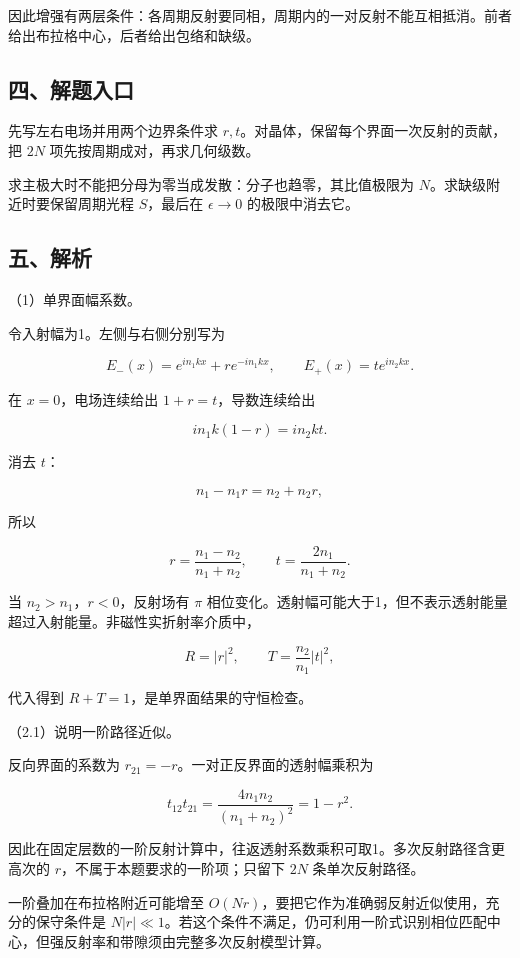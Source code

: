 \documentclass[12pt,a4paper,fontset=fandol]{ctexart}
\begin{document}
因此增强有两层条件：各周期反射要同相，周期内的一对反射不能互相抵消。前者给出布拉格中心，后者给出包络和缺级。

\subsection{四、解题入口}\label{ux56dbux89e3ux9898ux5165ux53e3-6}

先写左右电场并用两个边界条件求
\(r,t\)。对晶体，保留每个界面一次反射的贡献，把 \(2N\)
项先按周期成对，再求几何级数。

求主极大时不能把分母为零当成发散：分子也趋零，其比值极限为
\(N\)。求缺级附近时要保留周期光程 \(S\)，最后在 \(\epsilon\to0\)
的极限中消去它。

\subsection{五、解析}\label{ux4e94ux89e3ux6790-6}

（1）单界面幅系数。

令入射幅为1。左侧与右侧分别写为

\[
E_-(x)=e^{in_1kx}+r e^{-in_1kx},\qquad
E_+(x)=t e^{in_2kx}.
\]

在 \(x=0\)，电场连续给出 \(1+r=t\)，导数连续给出

\[
in_1k(1-r)=in_2kt.
\]

消去 \(t\)：

\[
n_1-n_1r=n_2+n_2r,
\]

所以

\[
\boxed{r=\frac{n_1-n_2}{n_1+n_2},\qquad
t=\frac{2n_1}{n_1+n_2}.}
\tag{7.1}
\]

当 \(n_2>n_1\)，\(r<0\)，反射场有 \(\pi\)
相位变化。透射幅可能大于1，但不表示透射能量超过入射能量。非磁性实折射率介质中，

\[
R=|r|^2,\qquad T=\frac{n_2}{n_1}|t|^2,
\]

代入得到 \(R+T=1\)，是单界面结果的守恒检查。

（2.1）说明一阶路径近似。

反向界面的系数为 \(r_{21}=-r\)。一对正反界面的透射幅乘积为

\[
t_{12}t_{21}=\frac{4n_1n_2}{(n_1+n_2)^2}=1-r^2.
\]

因此在固定层数的一阶反射计算中，往返透射系数乘积可取1。多次反射路径含更高次的
\(r\)，不属于本题要求的一阶项；只留下 \(2N\) 条单次反射路径。

一阶叠加在布拉格附近可能增至
\(O(Nr)\)，要把它作为准确弱反射近似使用，充分的保守条件是
\(N|r|\ll1\)。若这个条件不满足，仍可利用一阶式识别相位匹配中心，但强反射率和带隙须由完整多次反射模型计算。
\end{document}
